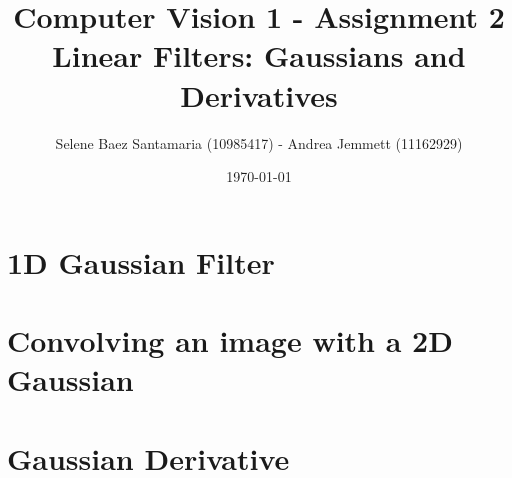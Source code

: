 \documentclass[11pt]{article}
\title{
	{Computer Vision 1 - Assignment 2 \\
	Linear Filters: Gaussians and Derivatives}
}
\author{
Selene Baez Santamaria (10985417) - Andrea Jemmett (11162929)}
\date{\today}
\begin{document}
\maketitle


\section{1D Gaussian Filter}


\section{Convolving an image with a 2D Gaussian}


\section{Gaussian Derivative}
\end{document}
